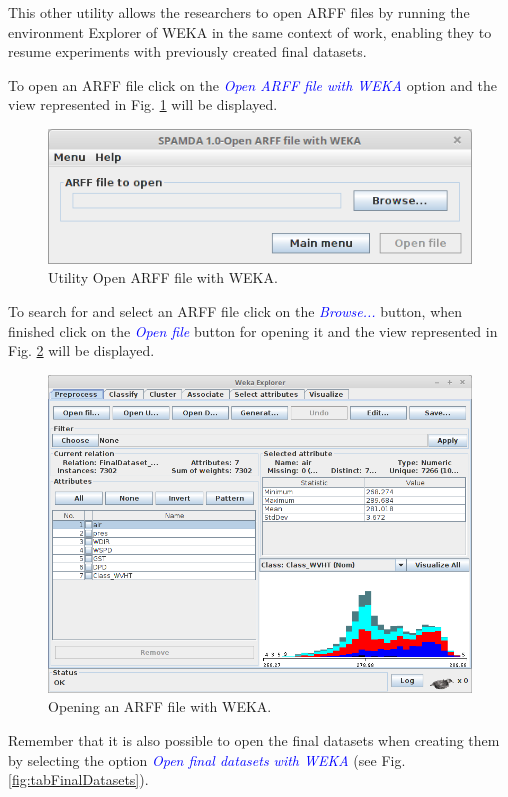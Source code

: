 \begin{onehalfspace}
				This other utility allows the researchers to open ARFF files by running the environment Explorer of WEKA in the same context of work, enabling they to resume experiments with previously created final datasets.
				
				To open an ARFF file click on the \textcolor{blue}{\textit{Open ARFF file with WEKA}} option and the view represented in Fig. \ref{fig:openARFFfile} will be displayed.
				
					\begin{figure}[ht!]
						\centering
						\includegraphics[scale=0.50]{figures/openARFFfile.png}
						\caption{Utility Open ARFF file with WEKA.}
						\label{fig:openARFFfile}
					\end{figure}
				
				To search for and select an ARFF file click on the \textcolor{blue}{\textit{Browse...}} button, when finished click on the \textcolor{blue}{\textit{Open file}} button for opening it and the view represented in Fig. \ref{fig:openingARFFFileWEKA} will be displayed.
					
					\begin{figure}[ht!]
						\centering
						\includegraphics[scale=0.50]{figures/openingARFFFileWEKA.png}
						\caption{Opening an ARFF file with WEKA.}
						\label{fig:openingARFFFileWEKA}
					\end{figure}
					
				Remember that it is also possible to open the final datasets when creating them by selecting the option \textcolor{blue}{\textit{Open final datasets with WEKA}} (see Fig. \ref{fig:tabFinalDatasets}).
				
	\end{onehalfspace}
